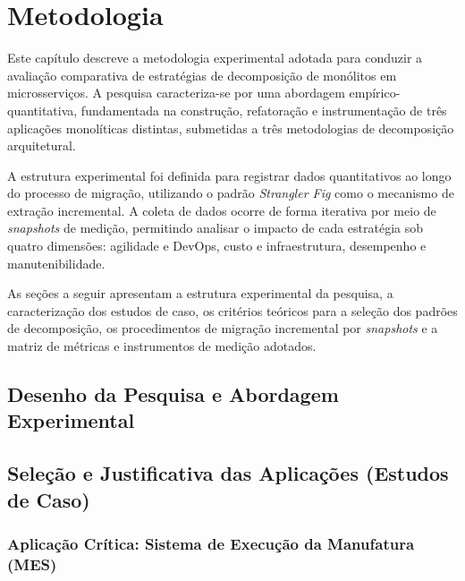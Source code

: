 \chapter{Metodologia}
\label{cap:metodologia}

Este capítulo descreve a metodologia experimental adotada para conduzir a avaliação comparativa de estratégias de decomposição de monólitos em microsserviços. A pesquisa caracteriza-se por uma abordagem empírico-quantitativa, fundamentada na construção, refatoração e instrumentação de três aplicações monolíticas distintas, submetidas a três metodologias de decomposição arquitetural.

A estrutura experimental foi definida para registrar dados quantitativos ao longo do processo de migração, utilizando o padrão \textit{Strangler Fig} como o mecanismo de extração incremental. A coleta de dados ocorre de forma iterativa por meio de \textit{snapshots} de medição, permitindo analisar o impacto de cada estratégia sob quatro dimensões: agilidade e DevOps, custo e infraestrutura, desempenho e manutenibilidade.

As seções a seguir apresentam a estrutura experimental da pesquisa, a caracterização dos estudos de caso, os critérios teóricos para a seleção dos padrões de decomposição, os procedimentos de migração incremental por \textit{snapshots} e a matriz de métricas e instrumentos de medição adotados.

\section{Desenho da Pesquisa e Abordagem Experimental}
\label{sec:desenho_pesquisa}

\section{Seleção e Justificativa das Aplicações (Estudos de Caso)}
\label{sec:selecao_aplicacoes}

\subsection{Aplicação Crítica: Sistema de Execução da Manufatura (MES)}

